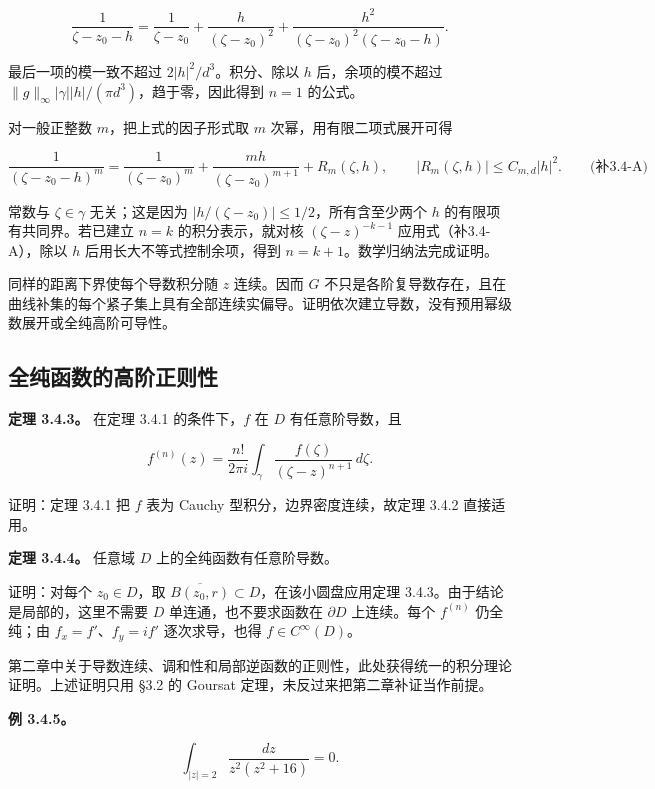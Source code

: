 \documentclass[11pt,a4paper]{article}
\begin{document}
\[
\frac1{\zeta-z_0-h}
=\frac1{\zeta-z_0}+\frac{h}{(\zeta-z_0)^2}
+\frac{h^2}{(\zeta-z_0)^2(\zeta-z_0-h)}.
\]

最后一项的模一致不超过 \(2|h|^2/d^3\)。积分、除以 \(h\)
后，余项的模不超过
\(\|g\|_\infty|\gamma||h|/(\pi d^3)\)，趋于零，因此得到 \(n=1\) 的公式。

对一般正整数 \(m\)，把上式的因子形式取 \(m\) 次幂，用有限二项式展开可得

\[
\frac1{(\zeta-z_0-h)^m}
=\frac1{(\zeta-z_0)^m}
+\frac{mh}{(\zeta-z_0)^{m+1}}+R_m(\zeta,h),
\qquad |R_m(\zeta,h)|\le C_{m,d}|h|^2.
\qquad\text{(补3.4-A)}
\]

常数与 \(\zeta\in\gamma\) 无关；这是因为
\(|h/(\zeta-z_0)|\le1/2\)，所有含至少两个 \(h\)
的有限项有共同界。若已建立 \(n=k\) 的积分表示，就对核
\((\zeta-z)^{-k-1}\) 应用式（补3.4-A），除以 \(h\)
后用长大不等式控制余项，得到 \(n=k+1\)。数学归纳法完成证明。

同样的距离下界使每个导数积分随 \(z\) 连续。因而 \(G\)
不只是各阶复导数存在，且在曲线补集的每个紧子集上具有全部连续实偏导。证明依次建立导数，没有预用幂级数展开或全纯高阶可导性。

\subsection{全纯函数的高阶正则性}\label{ch03-s4-ux5168ux7eafux51fdux6570ux7684ux9ad8ux9636ux6b63ux5219ux6027}

\textbf{定理 3.4.3。} 在定理 3.4.1 的条件下，\(f\) 在 \(D\)
有任意阶导数，且

\[
f^{(n)}(z)=\frac{n!}{2\pi i}\int_\gamma
\frac{f(\zeta)}{(\zeta-z)^{n+1}}\,d\zeta.
\]

证明：定理 3.4.1 把 \(f\) 表为 Cauchy 型积分，边界密度连续，故定理 3.4.2
直接适用。

\textbf{定理 3.4.4。} 任意域 \(D\) 上的全纯函数有任意阶导数。

证明：对每个 \(z_0\in D\)，取
\(\overline{B(z_0,r)}\subset D\)，在该小圆盘应用定理
3.4.3。由于结论是局部的，这里不需要 \(D\) 单连通，也不要求函数在
\(\partial D\) 上连续。每个 \(f^{(n)}\) 仍全纯；由
\(f_x=f'\)、\(f_y=if'\) 逐次求导，也得 \(f\in C^\infty(D)\)。

第二章中关于导数连续、调和性和局部逆函数的正则性，此处获得统一的积分理论证明。上述证明只用
§3.2 的 Goursat 定理，未反过来把第二章补证当作前提。

\textbf{例 3.4.5。}

\[
\int_{|z|=2}\frac{dz}{z^2(z^2+16)}=0.
\]
\end{document}
